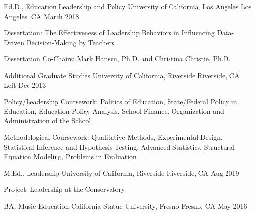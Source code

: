 

\begin{cventries}

  \cventry
    {Ed.D., Education Leadership and Policy} %
    {University of California, Los Angeles} %
    {Los Angeles, CA} %
    {March 2018} %
    {
      \begin{cvitems} %
        \item {Dissertation: The Effectiveness of Leadership Behaviors in Influencing Data-Driven Decision-Making by Teachers}
        \item {Dissertation Co-Chairs: Mark Hansen, Ph.D. and Christina Christie, Ph.D.        }
      \end{cvitems}
    }

  \cventry
    {Additional Graduate Studies} %
    {University of California, Riverside} %
    {Riverside, CA} %
    {Left Dec 2013} %
    {
      \begin{cvitems}
        \item Policy/Leadership Coursework: Politics of Education, State/Federal Policy in Education, Education Policy Analysis, School Finance, Organization and Administration of the School
        \item Methodological Coursework: Qualitative Methods, Experimental Design, Statistical Inference and Hypothesis Testing, Advanced Statistics, Structural Equation Modeling, Problems in Evaluation
      \end{cvitems}
    }

  \cventry
    {M.Ed., Leadership} %
    {University of California, Riverside} %
    {Riverside, CA} %
    {Aug 2019} %
    {
      \begin{cvitems} %
        \item {Project: Leadership at the Conservatory}
      \end{cvitems}
      }

  \cventry
    {BA, Music Education} %
    {California Statue University, Fresno} %
    {Fresno, CA} %
    {May 2016} %
    {
    }
  

\end{cventries}
